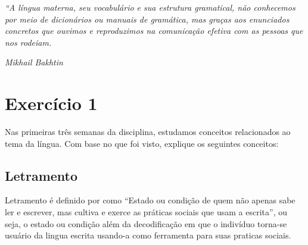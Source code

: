 \documentclass[
	12pt,				%
	openright,			%
	oneside,			%
	a4paper,			%
	english,			%
	french,				%
	spanish,			%
	brazil				%
	]{abntex2}
\begin{document}

\frenchspacing


\imprimircapa{}

\imprimirfolhaderosto*

\begin{epigrafe}
    \vspace*{\fill}
	\begin{flushright}
        \begin{adjustwidth}{7.5cm}{}
        \textit{``A língua materna, seu vocabulário e sua estrutura gramatical,
        não conhecemos por meio de dicionários ou manuais de gramática,
        mas graças aos enunciados concretos que ouvimos e reproduzimos
        na comunicação efetiva com as pessoas que nos rodeiam.}
        \end{adjustwidth}
        \textit{Mikhail Bakhtin}
	\end{flushright}
\end{epigrafe}

\tableofcontents*
\cleardoublepage{}

\textual{}

\chapter{Exercício 1}

Nas primeiras três semanas da disciplina, estudamos conceitos
relacionados ao tema da língua.
Com base no que foi visto, explique os seguintes conceitos:

\section{Letramento}
Letramento é definido por \hbox{\cite{soares}} como
``Estado ou condição de quem não apenas sabe ler e escrever,
mas cultiva e exerce as práticas sociais que usam a escrita'',
ou seja, o estado ou condição além da decodificação em que o
indivíduo torna-se usuário da lingua escrita usando-a como
ferramenta para suas praticas sociais.
\end{document}
